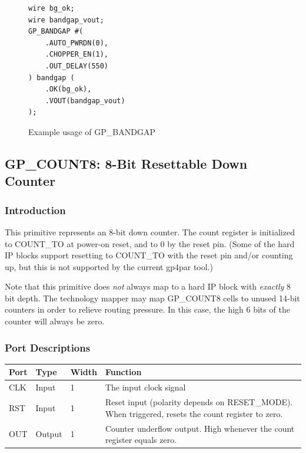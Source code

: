 \documentclass{article}
\begin{document}
\begin{figure}[h]
\begin{lstlisting}
wire bg_ok;
wire bandgap_vout;
GP_BANDGAP #(
	.AUTO_PWRDN(0),
	.CHOPPER_EN(1),
	.OUT_DELAY(550)
) bandgap (
	.OK(bg_ok),
	.VOUT(bandgap_vout)
);
\end{lstlisting}
\caption{Example usage of GP\_BANDGAP}
\label{gp-bandgap-example}
\end{figure}


\pagebreak
\subsection{GP\_COUNT8: 8-Bit Resettable Down Counter}

\subsubsection{Introduction}
This primitive represents an 8-bit down counter. The count register is initialized to COUNT\_TO at power-on reset, and 
to 0 by the reset pin. (Some of the hard IP blocks support resetting to COUNT\_TO with the reset pin and/or counting 
up, but this is not supported by the current gp4par tool.)

Note that this primitive does \emph{not} always map to a hard IP block with \emph{exactly} 8 bit depth. The technology 
mapper may map GP\_COUNT8 cells to unused 14-bit counters in order to relieve routing pressure. In this case, the high 
6 bits of the counter will always be zero.

\subsubsection{Port Descriptions}

\begin{tabularx}{5in}{|l|l|l|X|}
\hline
{\bfseries Port} & {\bfseries Type} & {\bfseries Width} & {\bfseries Function} \\
\hline
CLK & Input & 1 & The input clock signal\\
\hline
RST & Input & 1 & Reset input (polarity depends on RESET\_MODE). When triggered, resets the count register to zero. \\
\hline
OUT & Output & 1 & Counter underflow output. High whenever the count register equals zero. \\
\hline
\end{tabularx}
\end{document}
